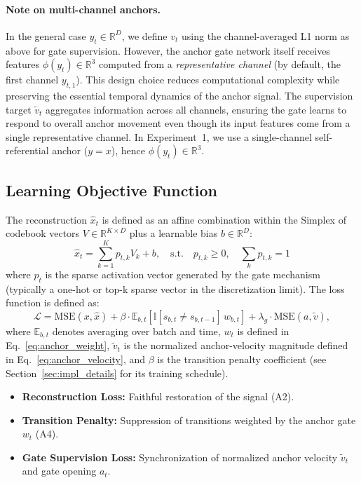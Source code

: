 \documentclass{article}
\begin{document}
\paragraph{Note on multi-channel anchors.}
In the general case $y_t\in\mathbb{R}^D$, we define $v_t$ using the channel-averaged L1 norm as above for gate supervision. However, the anchor gate network itself receives features $\phi(y_t)\in\mathbb{R}^{3}$ computed from a \emph{representative channel} (by default, the first channel $y_{t,1}$). This design choice reduces computational complexity while preserving the essential temporal dynamics of the anchor signal. The supervision target $\tilde{v}_t$ aggregates information across all channels, ensuring the gate learns to respond to overall anchor movement even though its input features come from a single representative channel. In Experiment~1, we use a single-channel self-referential anchor ($y=x$), hence $\phi(y_t)\in\mathbb{R}^{3}$.

\subsection{Learning Objective Function}
The reconstruction $\hat{x}_t$ is defined as an affine combination within the Simplex of codebook vectors $V \in \mathbb{R}^{K \times D}$ plus a learnable bias $b \in \mathbb{R}^D$:
\begin{equation}
    \hat{x}_t = \sum_{k=1}^{K} p_{t,k} V_k + b, \quad \text{s.t.} \quad p_{t,k} \ge 0, \quad \sum_{k} p_{t,k} = 1
    \label{eq:reconstruction}
\end{equation}
where $p_t$ is the sparse activation vector generated by the gate mechanism (typically a one-hot or top-k sparse vector in the discretization limit). The loss function is defined as:
\begin{equation}
\mathcal{L}
=
\mathrm{MSE}(x,\hat{x})
+
\beta \cdot \mathbb{E}_{b,t}\!\left[\mathbb{I}[s_{b,t}\neq s_{b,t-1}] \, w_{b,t}\right]
+
\lambda_g \cdot \mathrm{MSE}(a,\tilde{v}),
\label{eq:loss_function}
\end{equation}
where $\mathbb{E}_{b,t}$ denotes averaging over batch and time, $w_t$ is defined in Eq.~\eqref{eq:anchor_weight}, $\tilde{v}_t$ is the normalized anchor-velocity magnitude defined in Eq.~\eqref{eq:anchor_velocity}, and $\beta$ is the transition penalty coefficient (see Section~\ref{sec:impl_details} for its training schedule).

\begin{itemize}
    \item \textbf{Reconstruction Loss:} Faithful restoration of the signal (A2).
    \item \textbf{Transition Penalty:} Suppression of transitions weighted by the anchor gate $w_t$ (A4).
    \item \textbf{Gate Supervision Loss:} Synchronization of normalized anchor velocity $\tilde{v}_t$ and gate opening $a_t$.
\end{itemize}
\end{document}
